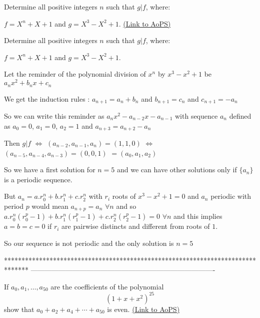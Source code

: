\begin{problem}
	Determine all positive integers $ n$ such that $ g|f$, where:

$ f=X^n+X+1$ and $ g=X^3-X^2+1.$
	\flushright \href{https://artofproblemsolving.com/community/c6h292364}{(Link to AoPS)}
\end{problem}



\begin{solution}
	\begin{tcolorbox}Determine all positive integers $ n$ such that $ g|f$, where:

$ f = X^n + X + 1$ and $ g = X^3 - X^2 + 1.$\end{tcolorbox}

Let the reminder of the polynomial division of $ x^n$ by $ x^3-x^2+1$ be $ a_nx^2+b_nx+c_n$

We get the induction rules : $ a_{n+1}=a_n+b_n$ and $ b_{n+1}=c_n$ and $ c_{n+1}=-a_n$

So we can write this reminder as $ a_nx^2-a_{n-2}x-a_{n-1}$ with sequence $ a_n$ defined as $ a_0=0$, $ a_1=0$, $ a_2=1$ and $ a_{n+3}=a_{n+2}-a_n$

Then $ g|f$ $ \iff$ $ (a_{n-2},a_{n-1},a_n)=(1,1,0)$ $ \iff$ $ (a_{n-5},a_{n-4},a_{n-3})=(0,0,1)$ $ =(a_0,a_1,a_2)$

So we have a first solution for $ n=5$ and we can have other solutions only if $ \{a_n\}$ is a periodic sequence.

But $ a_n=a.r_0^n+b.r_1^n+c.r_2^n$ with $ r_i$ roots of $ x^3-x^2+1=0$ and $ a_n$ periodic with period $ p$ would mean $ a_{n+p}=a_n$ $ \forall n$ and so $ a.r_0^n(r_0^p-1)+b.r_1^n(r_1^p-1)+c.r_2^n(r_2^p-1)=0$ $ \forall n$ and this implies $ a=b=c=0$ if $ r_i$ are pairwise distincts and different from roots of $ 1$.

So our sequence is not periodic and the only solution is $ n=5$
\end{solution}
*******************************************************************************
-------------------------------------------------------------------------------

\begin{problem}
	If $ a_0,a_1,\dots,a_{50}$ are the coefficients of the polynomial 
\[ \left(1+x+x^2\right)^{25}\]
show that $ a_0+a_2+a_4+\cdots+a_{50}$ is even.
	\flushright \href{https://artofproblemsolving.com/community/c6h295397}{(Link to AoPS)}
\end{problem}




